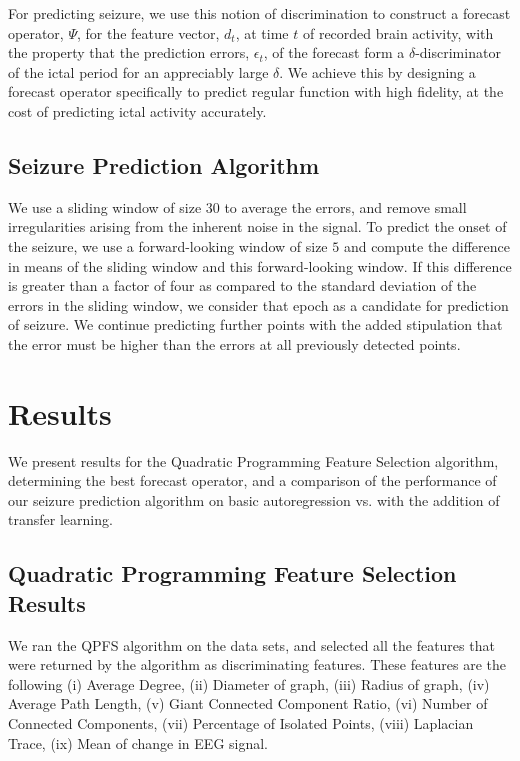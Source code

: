 \documentclass{article} %
\theoremstyle{definition}
\theoremstyle{remark}
\newcommand{\e}{\epsilon}
\renewcommand{\e}{\epsilon}
\begin{document}
For predicting seizure, we use this notion of discrimination to construct a forecast operator, $\Psi$, for the feature vector, $d_t$, at time $t$ of recorded brain activity, with the property that the prediction errors, $\e_t$, of the forecast form a $\delta$-discriminator of the ictal period for an appreciably large $\delta$. We achieve this by designing a forecast operator specifically to predict regular function with high fidelity, at the cost of predicting ictal activity accurately.  

\subsection{Seizure Prediction Algorithm}
We use a sliding window of size $30$ to average the errors, and remove small irregularities arising from the inherent noise in the signal.  To predict the onset of the seizure, we use a forward-looking window of size $5$ and compute the difference in means of the sliding window and this forward-looking window.  If this difference is greater than a factor of four as compared to the standard deviation of the errors in the sliding window, we consider that epoch as a candidate for prediction of seizure.  We continue predicting further points with the added stipulation that the error must be higher than the errors at all previously detected points.  

\section{Results} \label{sec:results}
We present results for the Quadratic Programming Feature Selection algorithm, determining the best forecast operator, and a comparison of the performance of our seizure prediction algorithm on basic autoregression vs. with the addition of transfer learning.

\subsection{Quadratic Programming Feature Selection Results}
We ran the QPFS algorithm on the data sets, and selected all the features that were returned by the algorithm as discriminating features.  These features are the following (i) Average Degree, (ii) Diameter of graph, (iii) Radius of graph, (iv) Average Path Length, (v) Giant Connected Component Ratio, (vi) Number of Connected Components, (vii) Percentage of Isolated Points, (viii) Laplacian Trace, (ix) Mean of change in EEG signal.
\end{document}

